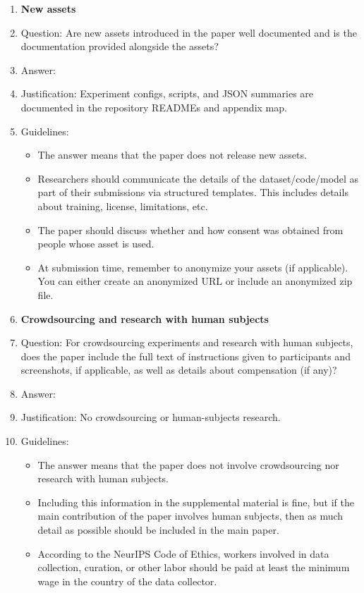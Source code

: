 \documentclass[
]{article}
\begin{document}
\begin{enumerate}
\item {\bf New assets}
    \item[] Question: Are new assets introduced in the paper well documented and is the documentation provided alongside the assets?
    \item[] Answer: \answerYes{} %
    \item[] Justification: Experiment configs, scripts, and JSON summaries are documented in the repository READMEs and appendix map.
    \item[] Guidelines:
    \begin{itemize}
        \item The answer \answerNA{} means that the paper does not release new assets.
        \item Researchers should communicate the details of the dataset\slash code\slash model as part of their submissions via structured templates. This includes details about training, license, limitations, etc. 
        \item The paper should discuss whether and how consent was obtained from people whose asset is used.
        \item At submission time, remember to anonymize your assets (if applicable). You can either create an anonymized URL or include an anonymized zip file.
    \end{itemize}

\item {\bf Crowdsourcing and research with human subjects}
    \item[] Question: For crowdsourcing experiments and research with human subjects, does the paper include the full text of instructions given to participants and screenshots, if applicable, as well as details about compensation (if any)? 
    \item[] Answer: \answerNA{} %
    \item[] Justification: No crowdsourcing or human-subjects research.
    \item[] Guidelines:
    \begin{itemize}
        \item The answer \answerNA{} means that the paper does not involve crowdsourcing nor research with human subjects.
        \item Including this information in the supplemental material is fine, but if the main contribution of the paper involves human subjects, then as much detail as possible should be included in the main paper. 
        \item According to the NeurIPS Code of Ethics, workers involved in data collection, curation, or other labor should be paid at least the minimum wage in the country of the data collector. 
    \end{itemize}


\end{enumerate}
\end{document}
